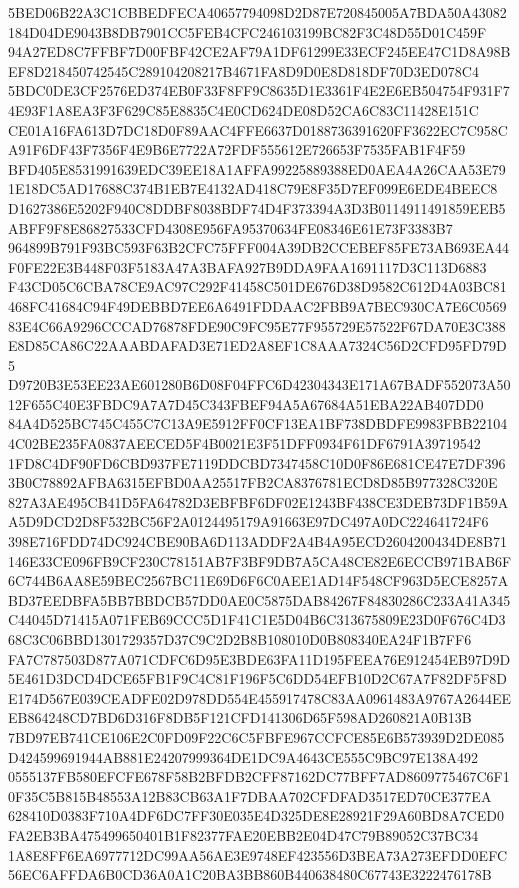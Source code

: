 \documentclass[UTF8,fontset=fandol,zihao=-4,a4paper]{ctexart}
\begin{document}
{{5BED06B22A3C1CBBEDFECA40657794098D2D87E720845005A7BDA50A43082184D04DE9043B8DB7901CC5FEB4CFC246103199BC82F3C48D55D01C459F
94A27ED8C7FFBF7D00FBF42CE2AF79A1DF61299E33ECF245EE47C1D8A98BEF8D218450742545C289104208217B4671FA8D9D0E8D818DF70D3ED078C4
5BDC0DE3CF2576ED374EB0F33F8FF9C8635D1E3361F4E2E6EB504754F931F74E93F1A8EA3F3F629C85E8835C4E0CD624DE08D52CA6C83C11428E151C
CE01A16FA613D7DC18D0F89AAC4FFE6637D0188736391620FF3622EC7C958CA91F6DF43F7356F4E9B6E7722A72FDF555612E726653F7535FAB1F4F59
BFD405E8531991639EDC39EE18A1AFFA99225889388ED0AEA4A26CAA53E791E18DC5AD17688C374B1EB7E4132AD418C79E8F35D7EF099E6EDE4BEEC8
D1627386E5202F940C8DDBF8038BDF74D4F373394A3D3B0114911491859EEB5ABFF9F8E86827533CFD4308E956FA95370634FE08346E61E73F3383B7
964899B791F93BC593F63B2CFC75FFF004A39DB2CCEBEF85FE73AB693EA44F0FE22E3B448F03F5183A47A3BAFA927B9DDA9FAA1691117D3C113D6883
F43CD05C6CBA78CE9AC97C292F41458C501DE676D38D9582C612D4A03BC81468FC41684C94F49DEBBD7EE6A6491FDDAAC2FBB9A7BEC930CA7E6C0569
83E4C66A9296CCCAD76878FDE90C9FC95E77F955729E57522F67DA70E3C388E8D85CA86C22AAABDAFAD3E71ED2A8EF1C8AAA7324C56D2CFD95FD79D5
D9720B3E53EE23AE601280B6D08F04FFC6D42304343E171A67BADF552073A5012F655C40E3FBDC9A7A7D45C343FBEF94A5A67684A51EBA22AB407DD0
84A4D525BC745C455C7C13A9E5912FF0CF13EA1BF738DBDFE9983FBB221044C02BE235FA0837AEECED5F4B0021E3F51DFF0934F61DF6791A39719542
1FD8C4DF90FD6CBD937FE7119DDCBD7347458C10D0F86E681CE47E7DF3963B0C78892AFBA6315EFBD0AA25517FB2CA8376781ECD8D85B977328C320E
827A3AE495CB41D5FA64782D3EBFBF6DF02E1243BF438CE3DEB73DF1B59AA5D9DCD2D8F532BC56F2A0124495179A91663E97DC497A0DC224641724F6
398E716FDD74DC924CBE90BA6D113ADDF2A4B4A95ECD2604200434DE8B71146E33CE096FB9CF230C78151AB7F3BF9DB7A5CA48CE82E6ECCB971BAB6F
6C744B6AA8E59BEC2567BC11E69D6F6C0AEE1AD14F548CF963D5ECE8257ABD37EEDBFA5BB7BBDCB57DD0AE0C5875DAB84267F84830286C233A41A345
C44045D71415A071FEB69CCC5D1F41C1E5D04B6C313675809E23D0F676C4D368C3C06BBD1301729357D37C9C2D2B8B108010D0B808340EA24F1B7FF6
FA7C787503D877A071CDFC6D95E3BDE63FA11D195FEEA76E912454EB97D9D5E461D3DCD4DCE65FB1F9C4C81F196F5C6DD54EFB10D2C67A7F82DF5F8D
E174D567E039CEADFE02D978DD554E455917478C83AA0961483A9767A2644EEEB864248CD7BD6D316F8DB5F121CFD141306D65F598AD260821A0B13B
7BD97EB741CE106E2C0FD09F22C6C5FBFE967CCFCE85E6B573939D2DE085D424599691944AB881E24207999364DE1DC9A4643CE555C9BC97E138A492
0555137FB580EFCFE678F58B2BFDB2CFF87162DC77BFF7AD8609775467C6F10F35C5B815B48553A12B83CB63A1F7DBAA702CFDFAD3517ED70CE377EA
628410D0383F710A4DF6DC7FF30E035E4D325DE8E28921F29A60BD8A7CED0FA2EB3BA475499650401B1F82377FAE20EBB2E04D47C79B89052C37BC34
1A8E8FF6EA6977712DC99AA56AE3E9748EF423556D3BEA73A273EFDD0EFC56EC6AFFDA6B0CD36A0A1C20BA3BB860B440638480C67743E3222476178B
}}
\end{document}
